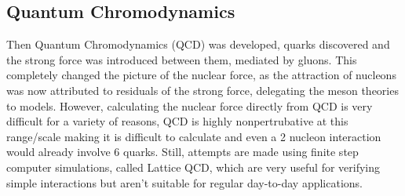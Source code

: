 




\subsection{Quantum Chromodynamics}
Then Quantum Chromodynamics (QCD) was developed, quarks discovered and the strong force was introduced between them, mediated by gluons.
This completely changed the picture of the nuclear force, as the attraction of nucleons was now attributed to residuals of the strong force, delegating the meson theories to models.
However, calculating the nuclear force directly from QCD is very difficult for a variety of reasons, QCD is highly nonpertrubative at this range/scale making it is difficult to calculate and even a 2 nucleon interaction would already involve 6 quarks.
Still, attempts are made using finite step computer simulations, called Lattice QCD, which are very useful for verifying simple interactions but aren't suitable for regular day-to-day applications.


